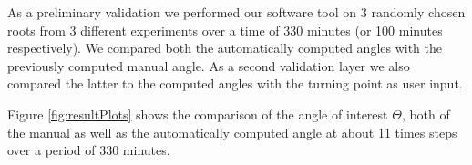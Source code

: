 As a preliminary validation we performed our software tool on 3 randomly chosen roots from 3 different experiments over a time of 330 minutes (or 100 minutes respectively). We compared both the automatically computed angles with the previously computed manual angle. As a second validation layer we also compared the latter to the computed angles with the turning point as user input.

Figure \ref{fig:resultPlots} shows the comparison of the angle of interest \( \Theta \), both of the manual as well as the automatically computed angle at about 11 times steps over a period of 330 minutes.




